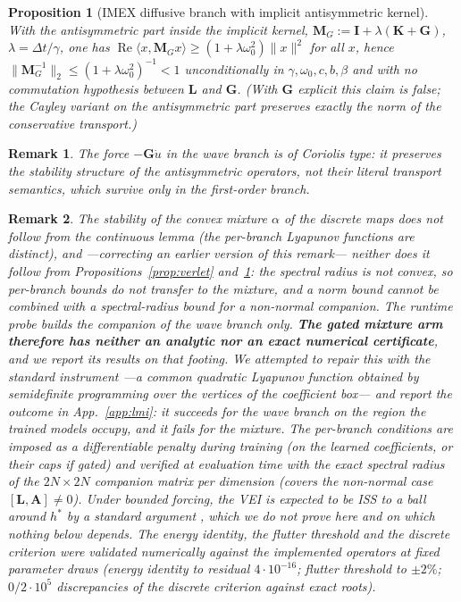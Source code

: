 \documentclass{article}
\newtheorem{proposition}{Proposition}
\newtheorem{remark}{Remark}
\begin{document}
\begin{proposition}[IMEX diffusive branch with implicit antisymmetric kernel]
\label{prop:imex}
With the antisymmetric part inside the implicit kernel,
$\mathbf{M}_G:=\mathbf{I}+\lambda(\mathbf{K}+\mathbf{G})$, $\lambda=\Delta t/\gamma$,
one has $\operatorname{Re}\langle x,\mathbf{M}_Gx\rangle\ge(1+\lambda\omega_0^2)\lVert x\rVert^2$
for all $x$, hence $\lVert\mathbf{M}_G^{-1}\rVert_2\le(1+\lambda\omega_0^2)^{-1}<1$
\emph{unconditionally} in $\gamma,\omega_0,c,b,\beta$ and with no commutation
hypothesis between $\mathbf{L}$ and $\mathbf{G}$. (With $\mathbf{G}$ explicit
this claim is false; the Cayley variant on the antisymmetric part preserves
exactly the norm of the conservative transport.)
\end{proposition}

\begin{remark}
The force $-\mathbf{G}\dot u$ in the wave branch is of Coriolis type: it
preserves the stability structure of the antisymmetric operators, not their
literal transport semantics, which survive only in the first-order branch.
\end{remark}

\begin{remark}
The stability of the convex mixture $\alpha$ of the discrete maps does not
follow from the continuous lemma (the per-branch Lyapunov functions are
distinct), and ---correcting an earlier version of this remark--- neither does
it follow from Propositions~\ref{prop:verlet} and~\ref{prop:imex}: the
spectral radius is not convex, so per-branch bounds do not transfer to the
mixture, and a norm bound cannot be combined with a spectral-radius bound for
a non-normal companion. The runtime probe builds the companion of the wave
branch only. \textbf{The gated mixture arm therefore has neither an analytic
nor an exact numerical certificate}, and we report its results on that
footing. We attempted to repair this with the standard instrument ---a common
quadratic Lyapunov function obtained by semidefinite programming over the
vertices of the coefficient box--- and report the outcome in
App.~\ref{app:lmi}: it succeeds for the wave branch on the region the trained
models occupy, and it fails for the mixture. The per-branch conditions are
imposed as a \emph{differentiable penalty} during training (on the learned
coefficients, or their caps if gated) and verified at evaluation time with the
exact spectral radius of the $2N{\times}2N$ \emph{companion} matrix per dimension
(covers the non-normal case $[\mathbf{L},\mathbf{A}]\ne0$). Under bounded
forcing, the VEI is expected to be ISS to a ball around $h^\ast$ by a standard
argument \citep{sontag1989smooth}, which we do not prove here and on which
nothing below depends. The energy identity, the flutter threshold and the
discrete criterion were validated numerically against
the implemented operators at fixed parameter draws (energy identity to residual $4{\cdot}10^{-16}$;
flutter threshold to $\pm2\%$; $0/2\cdot10^5$ discrepancies of the discrete
criterion against exact roots).
\end{remark}
\end{document}
